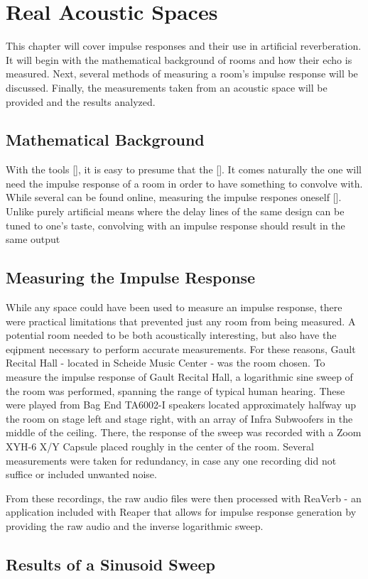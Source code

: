 \chapter{Real Acoustic Spaces}
\hspace*{-0.15cm}This chapter will cover impulse responses and their use in artificial reverberation. It will begin with the mathematical background of rooms and how their echo is measured. Next, several methods of measuring a room's impulse response will be discussed. Finally, the measurements taken from an acoustic space will be provided and the results analyzed.

\section{Mathematical Background}
With the tools [], it is easy to presume that the []. It comes naturally the one will need the impulse response of a room in order to have something to convolve with. While several can be found online, measuring the impulse respones oneself []. Unlike purely artificial means where the delay lines of the same design can be tuned to one's taste, convolving with an impulse response should result in the same output

\section{Measuring the Impulse Response}
While any space could have been used to measure an impulse response, there were practical limitations that prevented just any room from being measured. A potential room needed to be both acoustically interesting, but also have the eqipment necessary to perform accurate measurements. For these reasons, Gault Recital Hall - located in Scheide Music Center - was the room chosen. To measure the impulse response of Gault Recital Hall, a logarithmic sine sweep of the room was performed, spanning the range of typical human hearing. These were played from Bag End TA6002-I speakers located approximately halfway up the room on stage left and stage right, with an array of Infra Subwoofers in the middle of the ceiling. There, the response of the sweep was recorded with a Zoom XYH-6 X/Y Capsule placed roughly in the center of the room. Several measurements were taken for redundancy, in case any one recording did not suffice or included unwanted noise.

From these recordings, the raw audio files were then processed with ReaVerb - an application included with Reaper that allows for impulse response generation by providing the raw audio and the inverse logarithmic sweep.

\section{Results of a Sinusoid Sweep}
